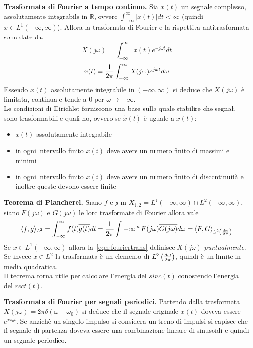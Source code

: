 \documentclass[a4paper,portrait,12pt]{article}
\theoremstyle{definition}
\begin{document}
\textbf{Trasformata di Fourier a tempo continuo.} Sia $x(t)$ un segnale complesso, assolutamente integrabile 
in $\mathbb{R}$, ovvero $\int_{-\infty}^{\infty}\left|x(t)\right|dt < \infty$ (quindi 
$x \in L^1(-\infty,\infty)$). Allora la trasfornata di Fourier e la rispettiva antitrasformata sono date da:
\begin{equation}
\label{eqn:fouriertrans}
X(j\omega) = \int_{-\infty}^{\infty}x(t) e^{-j\omega t}dt
\end{equation}
\begin{equation} 
\label{eqn:fourieranti}
x(t) = {1 \over 2\pi}\int_{-\infty}^{\infty} X(j\omega) e^{j\omega t} d\omega
\end{equation}
Essendo $x(t)$ assolutamente integrabile in $(-\infty,\infty)$ si deduce che $X(j\omega)$ è limitata, 
continua e tende a $0$ per $\omega \to \pm \infty$.\\
Le condizioni di Dirichlet forniscono una base sulla quale stabilire che segnali sono trasformabili e quali
no, ovvero se $\tilde{x}(t)$ è uguale a $x(t)$:
\begin{itemize}
\item $x(t)$ assolutamente integrabile
\item in ogni intervallo finito $x(t)$ deve avere un numero finito di massimi e minimi
\item in ogni intervallo finito $x(t)$ deve avere un numero finito di discontinuità e inoltre queste 
      devono essere finite
\end{itemize}
\bigskip

\textbf{Teorema di Plancherel.} Siano $f$ e $g$ in $X_{1,2} = L^1(-\infty,\infty) \cap L^2(-\infty,\infty)$, 
siano $F(j\omega)$ e $G(j\omega)$ le loro trasformate di Fourier allora vale
\begin{equation}
\label{eqn:plancherel}
\langle f,g \rangle_{L^2} = \int_{-\infty}^{\infty} f(t)\overline{g(t)} dt = {1 \over 2\pi}
\int{-\infty}^{\infty} F(j\omega)\overline{G(j\omega)}d\omega = \langle F,G \rangle_{L^2 \left({d\omega 
\over 2\pi}\right)} 
\end{equation}
Se $x \in L^1(-\infty,\infty)$ allora la~\eqref{eqn:fouriertrans} definisce $X(j\omega)$ 
\textit{puntualmente}. Se invece $x \in L^2$ la trasformata è un elemento di $L^2 \left({d\omega \over 2\pi}
\right)$, quindi è un limite in media quadratica.\\
Il teorema torna utile per calcolare l'energia del $sinc(t)$ conoscendo l'energia del $rect(t)$.
\bigskip

\textbf{Trasformata di Fourier per segnali periodici.} Partendo dalla trasformata $X(j\omega) = 2\pi\delta
(\omega -\omega_0)$ si deduce che il segnale originale $x(t)$ doveva essere $e^{j\omega_0 t}$. Se anzichè 
un singolo impulso si considera un treno di impulsi si capisce che il segnale di partenza doveva essere
una combinazione lineare di sinusoidi e quindi un segnale periodico.
\bigskip
\end{document}
